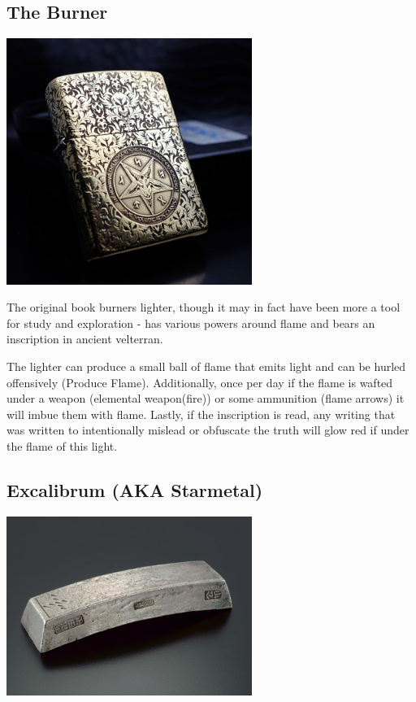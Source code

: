 \smallskip

\subsection*{The Burner} 

\begin{center}
\includegraphics[width=80mm]{./content/img/lighter.jpeg}
\begin{figure}[h]
\end{figure}
\end{center}

\noindent 

The original book burners lighter, though it may in fact have been more a tool for study and exploration - has various powers around flame and bears an inscription in ancient velterran. 	

The lighter can produce a small ball of flame that emits light and can be hurled offensively (Produce Flame). Additionally, once per day if the flame is wafted under a weapon (elemental weapon(fire)) or some ammunition (flame arrows) it will imbue them with flame. Lastly, if the inscription is read, any writing that was written to intentionally mislead or obfuscate the truth will glow red if under the flame of this light.

\smallskip

\subsection*{Excalibrum (AKA Starmetal)} 

\begin{center}
\includegraphics[width=80mm]{./content/img/excal3.jpg}
\begin{figure}[h]
\end{figure}
\end{center}

